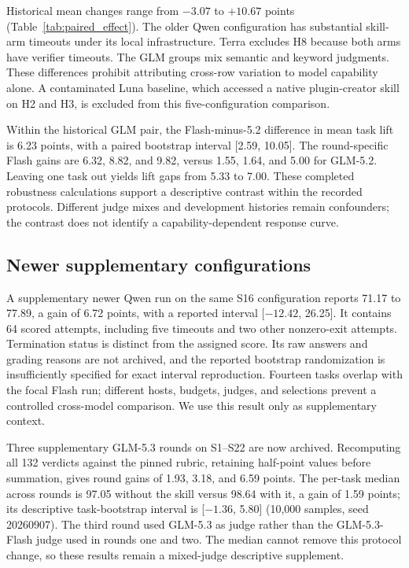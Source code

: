 \documentclass[11pt]{article}
\begin{document}

Historical mean changes range from $-3.07$ to $+10.67$ points (Table~\ref{tab:paired_effect}). The older Qwen configuration has substantial skill-arm timeouts under its local infrastructure. Terra excludes H8 because both arms have verifier timeouts. The GLM groups mix semantic and keyword judgments. These differences prohibit attributing cross-row variation to model capability alone. A contaminated Luna baseline, which accessed a native plugin-creator skill on H2 and H3, is excluded from this five-configuration comparison.

Within the historical GLM pair, the Flash-minus-5.2 difference in mean task lift is 6.23 points, with a paired bootstrap interval [2.59, 10.05]. The round-specific Flash gains are 6.32, 8.82, and 9.82, versus 1.55, 1.64, and 5.00 for GLM-5.2. Leaving one task out yields lift gaps from 5.33 to 7.00. These completed robustness calculations support a descriptive contrast within the recorded protocols. Different judge mixes and development histories remain confounders; the contrast does not identify a capability-dependent response curve.

\subsection{Newer supplementary configurations}
A supplementary newer Qwen run on the same S16 configuration reports 71.17 to 77.89, a gain of 6.72 points, with a reported interval [$-12.42$, 26.25]. It contains 64 scored attempts, including five timeouts and two other nonzero-exit attempts. Termination status is distinct from the assigned score. Its raw answers and grading reasons are not archived, and the reported bootstrap randomization is insufficiently specified for exact interval reproduction. Fourteen tasks overlap with the focal Flash run; different hosts, budgets, judges, and selections prevent a controlled cross-model comparison. We use this result only as supplementary context.

Three supplementary GLM-5.3 rounds on S1--S22 are now archived. Recomputing all 132 verdicts against the pinned rubric, retaining half-point values before summation, gives round gains of 1.93, 3.18, and 6.59 points. The per-task median across rounds is 97.05 without the skill versus 98.64 with it, a gain of 1.59 points; its descriptive task-bootstrap interval is [$-1.36$, 5.80] (10,000 samples, seed 20260907). The third round used GLM-5.3 as judge rather than the GLM-5.3-Flash judge used in rounds one and two. The median cannot remove this protocol change, so these results remain a mixed-judge descriptive supplement.
\end{document}
